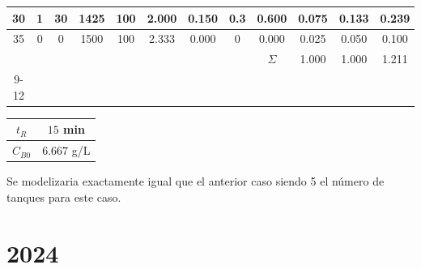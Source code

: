 {\begin{center}
{\begin{tabular}{|c|c|c|c|c|c|c|c|c|c|c|c|}
				30                    & 1          & 30            & 1425                     & 100              & 2.000    & 0.150 & 0.3              & 0.600              & 0.075               & 0.133                      & 0.239                        \\ \hline
				35                    & 0          & 0             & 1500                     & 100              & 2.333    & 0.000 & 0                & 0.000              & 0.025               & 0.050                      & 0.100                        \\ \hline
				\multicolumn{8}{c|}{} & $\Sigma$   & 1.000         & 1.000                    & 1.211                                                                                                                                                         \\ \cline{9-12}
			\end{tabular}
		}

		\vspace{1.5em}
		\begin{tabular}{|c|c|}
			\hline
			$t_R$    & $15$ min    \\ \hline
			$C_{B0}$ & $6.667$ g/L \\ \hline
		\end{tabular}
	\end{center}
	Se modelizaria exactamente igual que el anterior caso siendo 5 el número de tanques para este caso.

}

\newpage
\section{2024}

